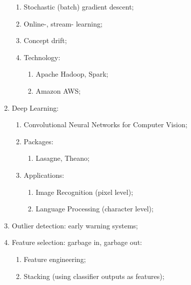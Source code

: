 \documentclass[a4paper]{article}
\begin{document}
\begin{enumerate}
\begin{enumerate}
    \item Stochastic (batch) gradient descent;
    \item Online-, stream- learning;
    \item Concept drift;
    \item Technology: \begin{enumerate}
      \item Apache Hadoop, Spark;
      \item Amazon AWS;
    \end{enumerate}
  \end{enumerate}
  \item Deep Learning: \begin{enumerate}
    \item Convolutional Neural Networks for Computer Vision;
    \item Packages: \begin{enumerate}
      \item Lasagne, Theano;
    \end{enumerate}
    \item Applications: \begin{enumerate}
      \item Image Recognition (pixel level);
      \item Language Processing (character level);
    \end{enumerate}
  \end{enumerate}
  \item Outlier detection: early warning systems;
  \item Feature selection: garbage in, garbage out: \begin{enumerate}
    \item Feature engineering;
    \item Stacking (using classifier outputs as features);
  \end{enumerate}
\end{enumerate}
\end{document}
